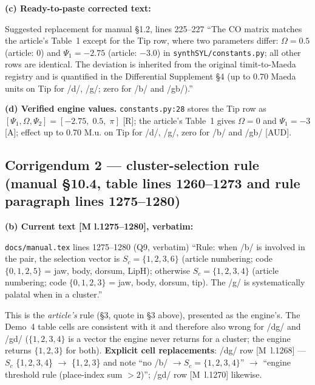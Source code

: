 \documentclass[11pt,letterpaper]{article}
\newcommand{\code}[1]{\texttt{#1}}
\newcommand{\Mua}{M.u.}
\begin{document}
\textbf{(c) Ready-to-paste corrected text:}
\begin{pastebox}{Suggested replacement for manual \S1.2, lines 225--227}
\small
``The CO matrix matches the article's Table~1 except for the Tip row, where
two parameters differ: $\Omega = 0.5$ (article: 0) and $\Psi_1 = -2.75$
(article: $-3.0$) in \code{synthSYL/constants.py}; all other rows are
identical. The deviation is inherited from the original timit-to-Maeda
registry and is quantified in the Differential Supplement \S4 (up to 0.70
Maeda units on Tip for /d/, /g/; zero for /b/ and /gb/).''
\end{pastebox}

\noindent\textbf{(d) Verified engine values.}
\code{constants.py:28} stores the Tip row as $[\Psi_1, \Omega, \Psi_2] =
[-2.75,\;0.5,\;\pi]$ \hbox{[R]}; the article's Table~1 gives $\Omega = 0$ and
$\Psi_1 = -3$ \hbox{[A]}; effect up to 0.70 \Mua{} on Tip for /d/, /g/, zero
for /b/ and /gb/ \hbox{[AUD]}.

\subsection*{Corrigendum 2 --- cluster-selection rule
(manual \S10.4, table lines 1260--1273 and rule paragraph lines 1275--1280)}

\textbf{(b) Current text [M l.1275--1280], verbatim:}
\begin{qbox}{\code{docs/manual.tex} lines 1275--1280 (Q9, verbatim)}
\small
``Rule: when /b/ is involved in the pair, the selection vector is
$S_c = \{1,2,3,6\}$ (article numbering; code $\{0,1,2,5\}$ = jaw, body,
dorsum, LipH); otherwise $S_c = \{1,2,3,4\}$ (article numbering; code
$\{0,1,2,3\}$ = jaw, body, dorsum, tip). The /g/ is systematically palatal
when in a cluster.''
\end{qbox}
\noindent This is the \emph{article's} rule (\S3, quote in \S3 above),
presented as the engine's. The Demo~4 table cells are consistent with it and
therefore also wrong for /dg/ and /gd/ ($\{1,2,3,4\}$ is a vector the engine
never returns for a cluster; the engine returns $\{1,2,3\}$ for both).
\textbf{Explicit cell replacements}: /dg/ row
\hbox{[M l.1268]} --- $S_c$ \{1,\,2,\,3,\,4\} $\to$ \{1,\,2,\,3\} and note
``no /b/ $\to S_c{=}\{1,2,3,4\}$'' $\to$ ``engine threshold rule
(place-index sum $> 2$)''; /gd/ row \hbox{[M l.1270]} likewise.
\end{document}
